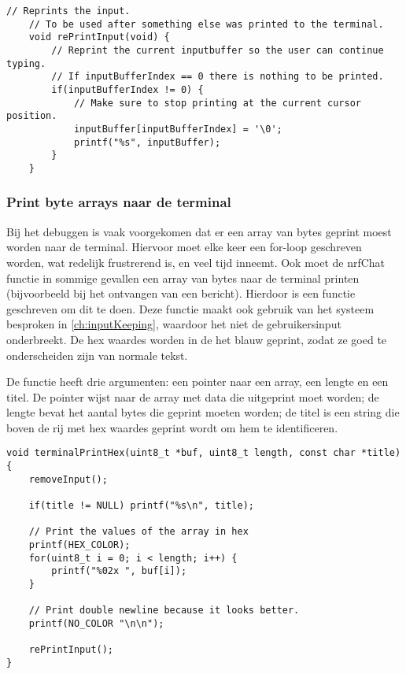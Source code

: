 \begin{lstlisting}[caption={De huidige input van de gebruiker opnieuw printen},captionpos=b,label={lst:reprintInput},style=c,xleftmargin=.\textwidth,xrightmargin=.\textwidth]
    // Reprints the input.
    // To be used after something else was printed to the terminal.
    void rePrintInput(void) {
        // Reprint the current inputbuffer so the user can continue typing.
        // If inputBufferIndex == 0 there is nothing to be printed.
        if(inputBufferIndex != 0) {
            // Make sure to stop printing at the current cursor position.
            inputBuffer[inputBufferIndex] = '\0';
            printf("%s", inputBuffer);
        }
    }
\end{lstlisting}

\subsubsection{Print byte arrays naar de terminal}\label{ch:printStrex}
Bij het debuggen is vaak voorgekomen dat er een array van bytes geprint moest worden naar de terminal. Hiervoor moet elke keer een for-loop geschreven worden, wat redelijk frustrerend is, en veel tijd inneemt. Ook moet de nrfChat functie in sommige gevallen een array van bytes naar de terminal printen (bijvoorbeeld bij het ontvangen van een bericht). Hierdoor is een functie geschreven om dit te doen. Deze functie maakt ook gebruik van het systeem besproken in \autoref{ch:inputKeeping}, waardoor het niet de gebruikersinput onderbreekt. De hex waardes worden in de het blauw geprint, zodat ze goed te onderscheiden zijn van normale tekst.

De functie heeft drie argumenten: een pointer naar een array, een lengte en een titel. De pointer wijst naar de array met data die uitgeprint moet worden; de lengte bevat het aantal bytes die geprint moeten worden; de titel is een string die boven de rij met hex waardes geprint wordt om hem te identificeren.

\begin{lstlisting}[caption={Een hex string printen naar de terminal},captionpos=b,label={lst:terminalPrintHex},style=c,xleftmargin=.\textwidth,xrightmargin=.\textwidth]
void terminalPrintHex(uint8_t *buf, uint8_t length, const char *title) {
    removeInput();

    if(title != NULL) printf("%s\n", title);

    // Print the values of the array in hex
    printf(HEX_COLOR);
    for(uint8_t i = 0; i < length; i++) {
        printf("%02x ", buf[i]);
    }

    // Print double newline because it looks better.
    printf(NO_COLOR "\n\n");

    rePrintInput();
}
\end{lstlisting}

